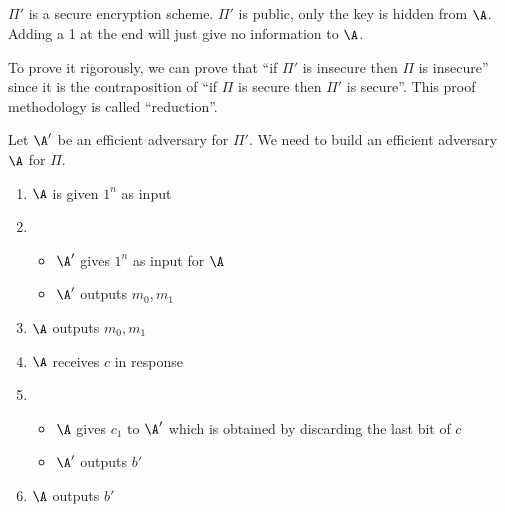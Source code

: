 \subsection{}
\begin{solution}
  $\Pi'$ is a secure encryption scheme.
  $\Pi'$ is public, only the key is hidden from $\A$.
  Adding a 1 at the end will just give no information to $\A$.

  To prove it rigorously, we can prove that ``if $\Pi'$ is insecure then $\Pi$ is insecure''
  since it is the contraposition of ``if $\Pi$ is secure then $\Pi'$ is secure''.
  This proof methodology is called ``reduction''.

  Let $\A'$ be an efficient adversary for $\Pi'$.
  We need to build an efficient adversary $\A$ for $\Pi$.
  \begin{enumerate}
    \item $\A$ is given $1^n$ as input
    \item
      \begin{itemize}
        \item $\A'$ gives $1^n$ as input for $\A$
        \item $\A'$ outputs $m_0, m_1$
      \end{itemize}
    \item $\A$ outputs $m_0, m_1$
    \item $\A$ receives $c$ in response
    \item
      \begin{itemize}
        \item $\A$ gives $c_1$ to $\A'$ which is obtained by discarding the last bit of $c$
        \item $\A'$ outputs $b'$
      \end{itemize}
    \item $\A$ outputs $b'$
  \end{enumerate}
\end{solution}

